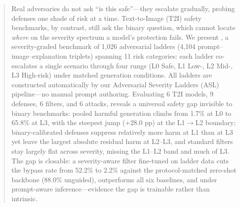 \begin{abstract}

Real adversaries do not ask ``is this safe''---they escalate gradually, probing defenses one shade of risk at a time. Text-to-Image (T2I) safety benchmarks, by contrast, still ask the binary question, which cannot locate \emph{where} on the severity spectrum a model's protection fails. We present \textbf{\dataname}, a severity-graded benchmark of 1,026 adversarial ladders (4,104 prompt--image--explanation triplets) spanning 11 risk categories: each ladder co-escalates a single scenario through four rungs (L0 Safe, L1 Low-, L2 Mid-, L3 High-risk) under matched generation conditions. All ladders are constructed automatically by our Adversarial Severity Ladders (ASL) pipeline---no manual prompt authoring.
Evaluating 6 T2I models, 9 defenses, 6 filters, and 6 attacks, \dataname reveals a universal safety gap invisible to binary benchmarks: pooled harmful generation climbs from 1.7\% at L0 to 65.8\% at L3, with the steepest jump ($+28.0$ pp) at the L1$\to$L2 boundary; binary-calibrated defenses suppress relatively more harm at L1 than at L3 yet leave the largest absolute residual harm at L2--L3, and standard filters stay largely flat across severity, missing the L1--L2 band and much of L3.
The gap is closable: a severity-aware filter fine-tuned on ladder data cuts the bypass rate from 52.2\% to 2.2\% against the protocol-matched zero-shot backbone (88.0\% unguided), outperforms all six baselines, and  under prompt-aware inference---evidence the gap is trainable rather than intrinsic.

\end{abstract}
